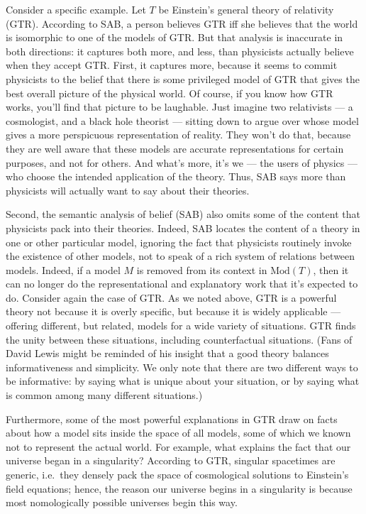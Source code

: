 Consider a specific example.  Let $T$ be Einstein's general theory of
relativity (GTR).  According to SAB, a person believes GTR iff she
believes that the world is isomorphic to one of the models of GTR.
But that analysis is inaccurate in both directions: it captures both
more, and less, than physicists actually believe when they accept GTR.
First, it captures more, because it seems to commit physicists to the
belief that there is some privileged model of GTR that gives the best
overall picture of the physical world.  Of course, if you know how GTR
works, you'll find that picture to be laughable.  Just imagine two
relativists --- a cosmologist, and a black hole theorist ---
sitting down to argue over whose model gives a more perspicuous
representation of reality.  They won't do that, because they are well
aware that these models are accurate representations for certain
purposes, and not for others.  And what's more, it's we --- the users
of physics --- who choose the intended application of the theory.
Thus, SAB says more than physicists will actually want to say about
their theories.

Second, the semantic analysis of belief (SAB) also omits some of the
content that physicists pack into their theories.  Indeed, SAB locates
the content of a theory in one or other particular model, ignoring the
fact that physicists routinely invoke the existence of other models,
not to speak of a rich system of relations between models.  Indeed, if
a model $M$ is removed from its context in $\mathrm{Mod}(T)$, then it
can no longer do the representational and explanatory work that it's
expected to do.  Consider again the case of GTR.  As we noted above,
GTR is a powerful theory not because it is overly specific, but
because it is widely applicable --- offering different, but related,
models for a wide variety of situations.  GTR finds the unity between
these situations, including counterfactual situations.  (Fans of David
Lewis might be reminded of his insight that a good theory balances
informativeness and simplicity.  We only note that there are two
different ways to be informative: by saying what is unique about your
situation, or by saying what is common among many different
situations.)

Furthermore, some of the most powerful explanations in GTR draw on
facts about how a model sits inside the space of all models, some of
which we known not to represent the actual world.  For example, what
explains the fact that our universe began in a singularity?  According
to GTR, singular spacetimes are generic, i.e.\ they densely pack the
space of cosmological solutions to Einstein's field equations; hence,
the reason our universe begins in a singularity is because most
nomologically possible universes begin this way.

